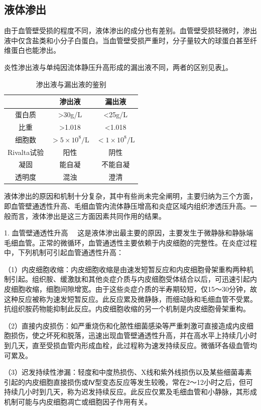 \subsection{液体渗出}

由于血管壁受损的程度不同，液体渗出的成分也有差别。血管壁受损轻微时，渗出液中仅含盐类和小分子白蛋白。当血管壁受损严重时，分子量较大的球蛋白甚至纤维蛋白也能渗出。

炎性渗出液与单纯因流体静压升高形成的漏出液不同，两者的区别见表\ref{tab4-1}。


    \begin{table}
        \centering
    \caption{渗出液与漏出液的鉴别}
    \label{tab4-1}
    \begin{tabular}{ccc}
    \toprule
    & 渗出液 & 漏出液 \\
    \midrule
    蛋白质 & >30g/L & <25g/L\\
    比重 & >1.018 & <1.018\\
    细胞数 & $>5\times 10^8/\text{L}$ &
    $<1\times 10^8/\text{L}$\\
    Rivalta试验 & 阳性 & 阴性\\
    凝固 & 能自凝 & 不能自凝\\
    透明度 & 混浊 & 澄清\\
    \bottomrule
    \end{tabular}
    \end{table}

液体渗出的原因和机制十分复杂，其中有些尚未完全阐明，主要归纳为三个方面，即血管壁通透性升高、毛细血管内流体静压增高和炎症区域内组织渗透压升高。一般而言，液体渗出是这三方面因素共同作用的结果。

{1. 血管壁通透性升高}
　这是液体渗出最主要的原因，主要发生于微静脉和静脉端毛细血管。正常的微循环，血管通透性主要依赖于内皮细胞的完整性。在炎症过程中，下列机制可引起血管通透性升高：

（1）内皮细胞收缩：内皮细胞收缩是由速发短暂反应和内皮细胞骨架重构两种机制引起。组织胺、缓激肽和其他炎症介质与内皮细胞受体结合以后，可迅速引起内皮细胞收缩，细胞间隙增宽。由于这些炎症介质的半寿期较短，仅15～30分钟，故这种反应被称为速发短暂反应。此反应累及微静脉，而细动脉和毛细血管不受累。抗组织胺药物能抑制此反应。内皮细胞收缩的另一个机制是内皮细胞骨架重构。

（2）直接内皮损伤：如严重烧伤和化脓性细菌感染等严重刺激可直接造成内皮细胞损伤，使之坏死和脱落，迅速出现血管壁通透性升高，并在高水平上持续几小时到几天，直至受损血管内形成血栓，此过程称为速发持续反应。微循环各级血管均可累及。

（3）迟发持续性渗漏：轻度和中度热损伤、X线和紫外线损伤以及某些细菌毒素引起的内皮细胞直接损伤或Ⅳ型变态反应等发生较晚，常在2～12小时之后，但可持续几小时到几天，称为迟发持续反应。此反应仅累及毛细血管和小静脉，其形成机制可能与内皮细胞凋亡或细胞因子作用有关。

